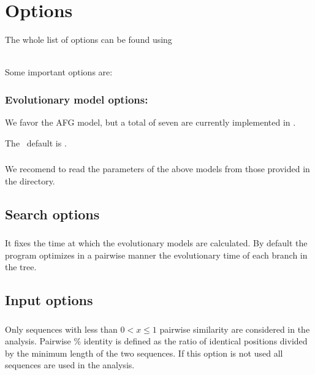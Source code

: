 \clearpage
\section{Options}
\label{section:options}
\setcounter{footnote}{0}

The whole list of options can be found using 

\\

Some important options are:

\subsubsection{Evolutionary model options: }
We favor the AFG model, but a total of seven
are currently implemented in \etwomsa. 

The \etwomsa\ default is .\\

\subsubsection{}

We recomend to read the parameters of the above models from those provided in the
 directory.

\subsection{Search options}

\subsubsection{}

It fixes the time at which the evolutionary models are calculated. By default
the program optimizes in a pairwise manner the evolutionary time of each branch in the tree.

\subsection{Input options}

\subsubsection{} Only sequences with less than $0<x\leq 1$
pairwise similarity are considered in the analysis.  Pairwise \%
identity is defined as the ratio of identical positions divided by the
minimum length of the two sequences. If this option is not used all
sequences are used in the analysis.

